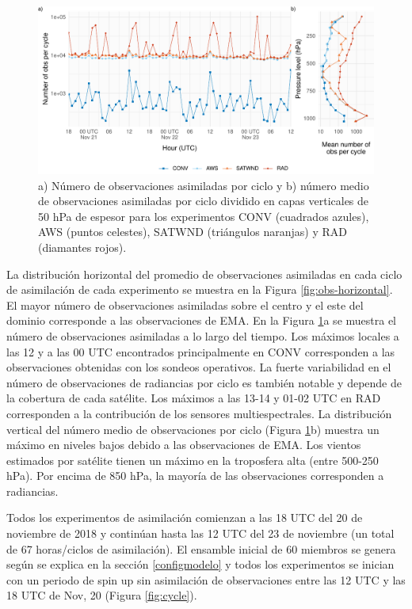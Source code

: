 \documentclass[12pt,oneside]{reedthesis}
\begin{document}
\begin{figure}
\includegraphics{thesis_files/figure-latex/obs-cycle-1} \caption{a) Número de observaciones asimiladas por ciclo y b) número medio de observaciones asimiladas por ciclo dividido en capas verticales de 50 hPa de espesor para los experimentos CONV (cuadrados azules), AWS (puntos celestes), SATWND (triángulos naranjas) y RAD (diamantes rojos).}\label{fig:obs-cycle}
\end{figure}
La distribución horizontal del promedio de observaciones asimiladas en cada ciclo de asimilación de cada experimento se muestra en la Figura \ref{fig:obs-horizontal}. El mayor número de observaciones asimiladas sobre el centro y el este del dominio corresponde a las observaciones de EMA. En la Figura \ref{fig:obs-cycle}a se muestra el número de observaciones asimiladas a lo largo del tiempo. Los máximos locales a las 12 y a las 00 UTC encontrados principalmente en CONV corresponden a las observaciones obtenidas con los sondeos operativos. La fuerte variabilidad en el número de observaciones de radiancias por ciclo es también notable y depende de la cobertura de cada satélite. Los máximos a las 13-14 y 01-02 UTC en RAD corresponden a la contribución de los sensores multiespectrales. La distribución vertical del número medio de observaciones por ciclo (Figura \ref{fig:obs-cycle}b) muestra un máximo en niveles bajos debido a las observaciones de EMA. Los vientos estimados por satélite tienen un máximo en la troposfera alta (entre 500-250 hPa). Por encima de 850 hPa, la mayoría de las observaciones corresponden a radiancias.

Todos los experimentos de asimilación comienzan a las 18 UTC del 20 de noviembre de 2018 y continúan hasta las 12 UTC del 23 de noviembre (un total de 67 horas/ciclos de asimilación). El ensamble inicial de 60 miembros se genera según se explica en la sección \ref{configmodelo} y todos los experimentos se inician con un periodo de spin up sin asimilación de observaciones entre las 12 UTC y las 18 UTC de Nov, 20 (Figura \ref{fig:cycle}).
\end{document}
